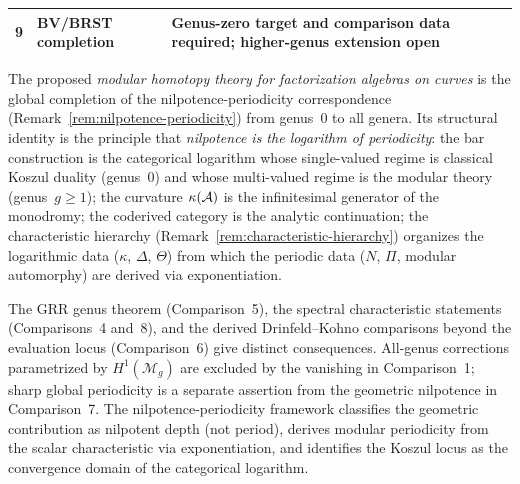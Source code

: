 \begin{remark}
\begin{center}
\begin{tabular}{@{}clp{5.5cm}@{}}
9 & BV/BRST completion & Genus-zero target and comparison data required; higher-genus extension open \\
\bottomrule
\end{tabular}
\end{center}
\noindent
The proposed \emph{modular homotopy theory for
factorization algebras on curves} is the global completion of the
nilpotence-periodicity correspondence
(Remark~\ref{rem:nilpotence-periodicity}) from genus~$0$ to all
genera.  Its structural identity is the principle that
\emph{nilpotence is the logarithm of periodicity}: the bar
construction is the categorical logarithm whose single-valued
regime is classical Koszul duality (genus~$0$) and whose
multi-valued regime is the modular theory (genus~$g \geq 1$); the
curvature $\kappa(\mathcal{A})$ is the infinitesimal generator of the
monodromy; the coderived category is the analytic continuation; the
characteristic hierarchy
(Remark~\ref{rem:characteristic-hierarchy}) organizes the
logarithmic data ($\kappa$, $\Delta$, $\Theta$) from which the
periodic data ($N$, $\Pi$, modular automorphy) are derived via
exponentiation.

The GRR genus theorem (Comparison~5), the spectral characteristic statements
(Comparisons~4 and~8), and the derived Drinfeld--Kohno comparisons beyond the evaluation locus
(Comparison~6) give distinct consequences.  All-genus corrections parametrized by
$H^1(\mathcal M_g)$ are excluded by the vanishing in Comparison~1;
sharp global periodicity is a separate assertion from the geometric nilpotence in Comparison~7.
The nilpotence-periodicity framework
classifies the geometric contribution as nilpotent depth (not
period), derives modular periodicity from the scalar
characteristic via exponentiation, and identifies the Koszul locus
as the convergence domain of the categorical logarithm.
\end{remark}


